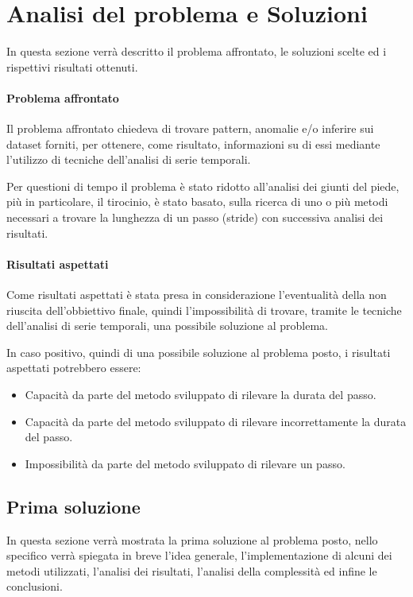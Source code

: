 \section{Analisi del problema e Soluzioni}
In questa sezione verrà descritto il problema affrontato, le soluzioni scelte ed i rispettivi
risultati ottenuti.

\paragraph{Problema affrontato}
Il problema affrontato chiedeva di trovare pattern, anomalie e/o inferire sui dataset forniti, 
per ottenere, come risultato, informazioni su di essi mediante l'utilizzo di tecniche 
dell'analisi di serie temporali.

Per questioni di tempo il problema è stato ridotto all'analisi dei giunti del piede, più in particolare,
il tirocinio, è stato basato, sulla ricerca di uno o più metodi necessari a trovare la lunghezza di un passo
(stride) con successiva analisi dei risultati.



\paragraph{Risultati aspettati}
\begin{sloppypar}
Come risultati aspettati è stata presa in considerazione l'eventualità della non riuscita dell'obbiettivo finale,
quindi l'impossibilità di trovare, tramite le tecniche dell'analisi di serie temporali, una possibile soluzione
al problema.
\end{sloppypar}

In caso positivo, quindi di una possibile soluzione al problema posto, i risultati aspettati potrebbero essere:
\begin{itemize}
    \setlength\itemsep{-0.5em}
    \item Capacità da parte del metodo sviluppato di rilevare la durata del passo.
    \item Capacità da parte del metodo sviluppato di rilevare incorrettamente la durata del passo.
    \item Impossibilità da parte del metodo sviluppato di rilevare un passo.
\end{itemize}


\subsection{Prima soluzione}
In questa sezione verrà mostrata la prima soluzione al problema posto, nello specifico verrà
spiegata in breve l'idea generale, l'implementazione di alcuni dei metodi utilizzati, l'analisi dei
risultati, l'analisi della complessità ed infine le conclusioni.


